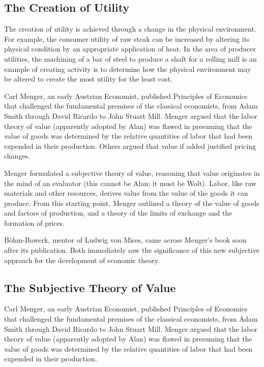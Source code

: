 \subsection{The Creation of Utility}

The creation of utility is achieved through a change in the physical environment. For example, the consumer utility of raw steak can be increased by altering its physical condition by an appropriate application of heat. In the area of producer utilities, the machining of a bar of steel to produce a shaft for a rolling mill is an example of creating activity is to determine how the physical environment may be altered to create the most utility for the least cost.

Carl Menger, an early Austrian Economist, published Principles of Economics that challenged the fundamental premises of the classical economists, from Adam Smith through David Ricardo to John Stuart Mill. Menger argued that the labor theory of value (apparently adopted by Alan) was flawed in presuming that the value of goods was determined by the relative quantities of labor that had been expended in their production. Others argued that value if added justified pricing changes.

Menger formulated a subjective theory of value, reasoning that value originates in the mind of an evaluator (this cannot be Alan; it must be Wolt). Labor, like raw materials and other resources, derives value from the value of the goods it can produce. From this starting point, Menger outlined a theory of the value of goods and factors of production, and a theory of the limits of exchange and the formation of prices.

Böhm-Bawerk, mentor of Ludwig von Mises, came across Menger’s book soon after its publication. Both immediately saw the significance of this new subjective approach for the development of economic theory.

\subsection{The Subjective Theory of Value}

Carl Menger, an early Austrian Economist, published Principles of Economics that challenged the fundamental premises of the classical economists, from Adam Smith through David Ricardo to John Stuart Mill. Menger argued that the labor theory of value (apparently adopted by Alan) was flawed in presuming that the value of goods was determined by the relative quantities of labor that had been expended in their production.

